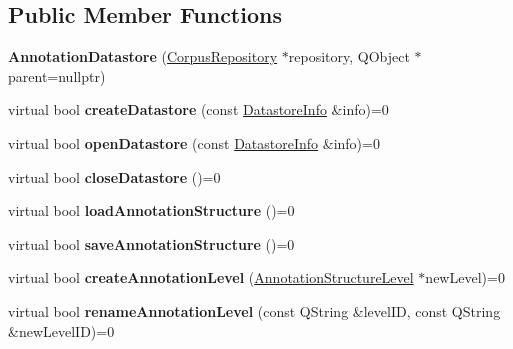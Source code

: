 \subsection*{Public Member Functions}
\begin{DoxyCompactItemize}
\item 
\mbox{\label{class_annotation_datastore_a7236e3eb5f39496f04501c0b52c1a7ea}} 
{\bfseries Annotation\+Datastore} (\hyperlink{class_corpus_repository}{Corpus\+Repository} $\ast$repository, Q\+Object $\ast$parent=nullptr)
\item 
\mbox{\label{class_annotation_datastore_a859f9c1852d1b8926aed7a1783ae8e46}} 
virtual bool {\bfseries create\+Datastore} (const \hyperlink{class_datastore_info}{Datastore\+Info} \&info)=0
\item 
\mbox{\label{class_annotation_datastore_afb514e9043387c27e31f6696c7d8a1a9}} 
virtual bool {\bfseries open\+Datastore} (const \hyperlink{class_datastore_info}{Datastore\+Info} \&info)=0
\item 
\mbox{\label{class_annotation_datastore_a03a3a2339a362a4bfa2167386c5309d8}} 
virtual bool {\bfseries close\+Datastore} ()=0
\item 
\mbox{\label{class_annotation_datastore_a0653d5ceed01c982248f85cc8a167925}} 
virtual bool {\bfseries load\+Annotation\+Structure} ()=0
\item 
\mbox{\label{class_annotation_datastore_a20fc685cb76fb6df83b5f457c61d21f9}} 
virtual bool {\bfseries save\+Annotation\+Structure} ()=0
\item 
\mbox{\label{class_annotation_datastore_a0275ed62dcaacf19c2fbd77776b7a8df}} 
virtual bool {\bfseries create\+Annotation\+Level} (\hyperlink{class_annotation_structure_level}{Annotation\+Structure\+Level} $\ast$new\+Level)=0
\item 
\mbox{\label{class_annotation_datastore_aa90102ec514fd09d24516206bd1c0214}} 
virtual bool {\bfseries rename\+Annotation\+Level} (const Q\+String \&level\+ID, const Q\+String \&new\+Level\+ID)=0

\end{DoxyCompactItemize}
